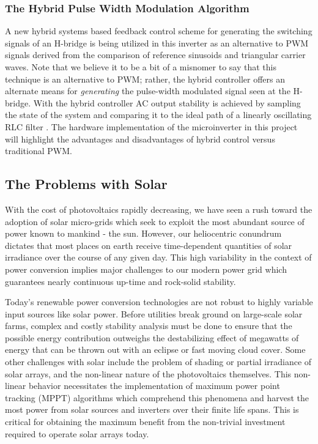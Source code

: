 \subsubsection{The Hybrid Pulse Width Modulation Algorithm}
A new hybrid systems based feedback control scheme for generating the switching signals of an H-bridge is being utilized in this inverter as an alternative to PWM signals derived from the comparison of reference sinusoids and triangular carrier waves. Note that we believe it to be a bit of a misnomer to say that this technique is an alternative to PWM; rather, the hybrid controller offers an alternate means for \emph{generating} the pulse-width modulated signal seen at the H-bridge. 
With the hybrid controller AC output stability is achieved by sampling the state of the system and comparing it to the ideal path of a linearly oscillating RLC filter \cite{ricardo}. The hardware implementation of the microinverter in this project will highlight the advantages and disadvantages of hybrid control versus traditional PWM.

\subsection{The Problems with Solar}
With the cost of photovoltaics rapidly decreasing, we have seen a rush toward the adoption of solar micro-grids which seek to exploit the most abundant source of power known to mankind - the sun. However, our heliocentric conundrum dictates that most places on earth receive time-dependent quantities of solar irradiance over the course of any given day. This high variability in the context of power conversion implies major challenges to our modern power grid which guarantees nearly continuous up-time and rock-solid stability. 

Today's renewable power conversion technologies are not robust to highly variable input sources like solar power. Before utilities break ground on large-scale solar farms, complex and costly stability analysis must be done to ensure that the possible energy contribution outweighs the destabilizing effect of megawatts of energy that can be thrown out with an eclipse or fast moving cloud cover. Some other challenges with solar include  the problem of shading or partial irradiance of solar arrays, and the non-linear nature of the photovoltaics themselves. This non-linear behavior necessitates the implementation of maximum power point tracking (MPPT) algorithms which comprehend this phenomena and harvest the most power from solar sources and inverters over their finite life spans. This is critical for obtaining the maximum benefit from the non-trivial investment required to operate solar arrays today. 

